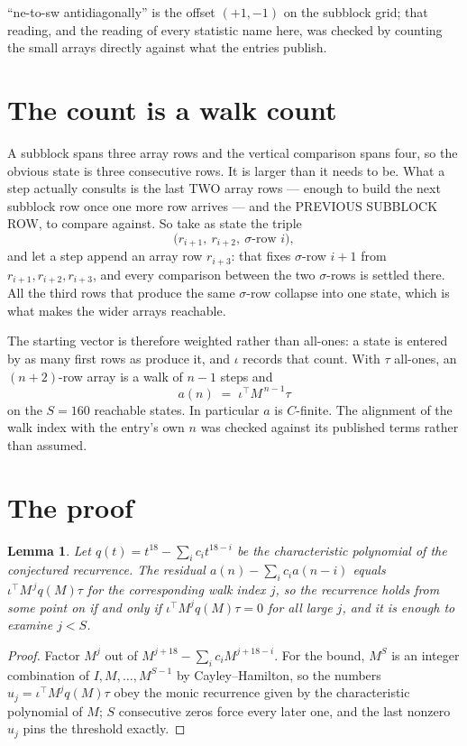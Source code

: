 \documentclass[11pt,a4paper]{article}
\theoremstyle{plain}
\newtheorem{lemma}[theorem]{Lemma}
\theoremstyle{definition}
\begin{document}
``ne-to-sw antidiagonally'' is the offset $(+1,-1)$ on the subblock grid; that reading, and
the reading of every statistic name here, was checked by counting the small arrays directly
against what the entries publish.

\section{The count is a walk count}

A subblock spans three array rows and the vertical comparison spans four, so the obvious state
is three consecutive rows. It is larger than it needs to be. What a step actually consults is
the last TWO array rows --- enough to build the next subblock row once one more row arrives ---
and the PREVIOUS SUBBLOCK ROW, to compare against. So take as state the triple
\[
\bigl(r_{i+1},\ r_{i+2},\ \sigma\text{-row }i\bigr),
\]
and let a step append an array row $r_{i+3}$: that fixes $\sigma$-row $i+1$ from
$r_{i+1},r_{i+2},r_{i+3}$, and every comparison between the two $\sigma$-rows is settled
there. All the third rows that produce the same $\sigma$-row collapse into one state, which is
what makes the wider arrays reachable.

The starting vector is therefore weighted rather than all-ones: a state is entered by as many
first rows as produce it, and $\iota$ records that count. With $\tau$ all-ones, an
$(n+2)$-row array is a walk of $n-1$ steps and
\[
a(n)\;=\;\iota^{\!\top}M^{\,n-1}\tau
\]
on the $S=160$ reachable states. In particular $a$ is $C$-finite. The alignment of the walk
index with the entry's own $n$ was checked against its published terms rather than assumed.

\section{The proof}

\begin{lemma}\label{lem:crit}
Let $q(t)=t^{18}-\sum_i c_it^{18-i}$ be the characteristic polynomial of the
conjectured recurrence. The residual $a(n)-\sum_ic_ia(n-i)$ equals
$\iota^{\!\top}M^{\,j}q(M)\tau$ for the corresponding walk index $j$, so the recurrence
holds from some point on if and only if $\iota^{\!\top}M^{j}q(M)\tau=0$ for all large $j$,
and it is enough to examine $j<S$.
\end{lemma}

\begin{proof}
Factor $M^{j}$ out of $M^{j+18}-\sum_ic_iM^{j+18-i}$. For the bound, $M^{S}$
is an integer combination of $I,M,\dots,M^{S-1}$ by Cayley--Hamilton, so the numbers
$u_j=\iota^{\!\top}M^{j}q(M)\tau$ obey the monic recurrence given by the characteristic
polynomial of $M$; $S$ consecutive zeros force every later one, and the last nonzero $u_j$
pins the threshold exactly.
\end{proof}
\end{document}
